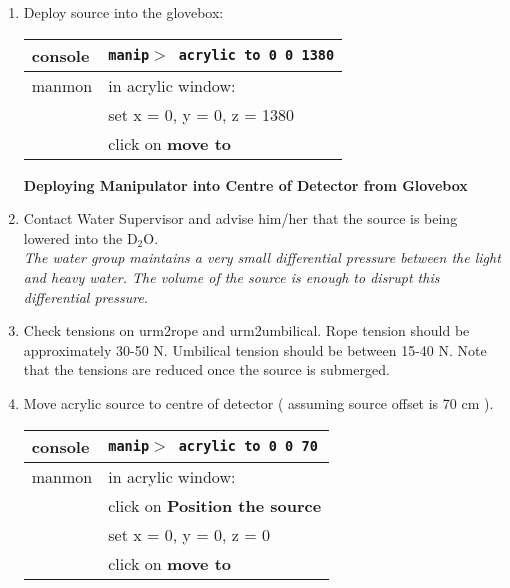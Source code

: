 \begin{enumerate}
 \item\checkbox Deploy source into the glovebox:
  \begin{center}
  \begin{tabular}{|l|l|}
  \hline
  console & {\tt manip$>$ acrylic to 0 0 1380} \\
  \hline
  manmon  & in acrylic window: \\

          & set x = 0, y = 0, z = 1380\\
          & click on {\bf move to} \\
  \hline
  \end{tabular}
  \end{center}



\begin{center}
  {\bf Deploying Manipulator into Centre of
            Detector from Glovebox}
\end{center}


 \item\checkbox Contact Water Supervisor and advise him/her that the source is
   being lowered into the D$_2$O.  \\
   \small
   {\em
     The water group maintains a very small differential pressure
     between the light and heavy water.  The volume of the source
     is enough to disrupt this differential pressure.
   }
   \normalsize

 \item\checkbox Check tensions on urm2rope and urm2umbilical.  Rope tension
   should be approximately 30-50 N.  Umbilical tension should
   be between 15-40 N. Note that the tensions are reduced once the
source is submerged.


 \item\checkbox Move acrylic source to centre of detector ( assuming source offset is 70 cm ).
  \begin{center}
  \begin{tabular}{|l|l|}
  \hline
  console & {\tt manip$>$ acrylic to 0 0 70} \\
  \hline
  manmon  & in acrylic window: \\
          & click on {\bf Position the source}\\
          & set x = 0, y = 0, z = 0\\
          & click on {\bf move to} \\
  \hline
  \end{tabular}
  \end{center}


\end{enumerate}
